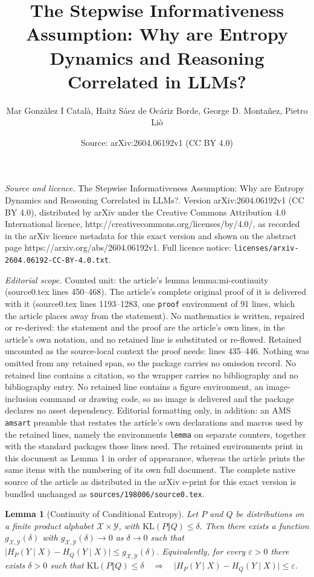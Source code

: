 \documentclass[10pt,a4paper]{amsart}
\title{The Stepwise Informativeness Assumption: Why are Entropy Dynamics and Reasoning Correlated in LLMs?}
\author{Mar Gonz\`alez I Catal\`a, Haitz S\'aez de Oc\'ariz Borde, George D. Monta\~nez, Pietro Li\`o}
\date{Source: arXiv:2604.06192v1 (CC BY 4.0)}
\newtheorem{lemma}{Lemma}
\begin{document}
\maketitle

\noindent\emph{Source and licence.} The Stepwise Informativeness Assumption: Why are Entropy Dynamics and Reasoning Correlated in LLMs?. Version arXiv:2604.06192v1 (CC BY 4.0), distributed by arXiv under the Creative Commons Attribution 4.0 International licence, http://creativecommons.org/licenses/by/4.0/, as recorded in the arXiv licence metadata for this exact version and shown on the abstract page https://arxiv.org/abs/2604.06192v1. Full licence notice: \texttt{licenses/arxiv-2604.06192-CC-BY-4.0.txt}.\par\smallskip

\noindent\textit{Editorial scope.} Counted unit: the article's lemma lemma:mi-continuity (source0.tex lines 450--468). The article's complete original proof of it is delivered with it (source0.tex lines 1193--1283, one \texttt{proof} environment of 91 lines, which the article places away from the statement). No mathematics is written, repaired or re-derived: the statement and the proof are the article's own lines, in the article's own notation, and no retained line is substituted or re-flowed.  Retained uncounted as the source-local context the proof needs: lines 435--446.  Nothing was omitted from any retained span, so the package carries no omission record.  No retained line contains a citation, so the wrapper carries no bibliography and no bibliography entry.  No retained line contains a figure environment, an image-inclusion command or drawing code, so no image is delivered and the package declares no asset dependency.  Editorial formatting only, in addition: an AMS \texttt{amsart} preamble that restates the article's own declarations and macros used by the retained lines, namely the environments \texttt{lemma} on separate counters, together with the standard packages those lines need.  The retained environments print in this document as Lemma 1 in order of appearance, whereas the article prints the same items with the numbering of its own full document.  The complete native source of the article as distributed in the arXiv e-print for this exact version is bundled unchanged as \texttt{sources/198006/source0.tex}.
\begin{lemma}[Continuity of Conditional Entropy]\label{lemma:cond-entropy-continuity}
Let $P$ and $Q$ be distributions on a finite product alphabet
$\mathcal{X} \times \mathcal{Y}$, with $\mathrm{KL}(P \Vert Q) \le \delta.$
Then there exists a function $g_{\mathcal{X},\mathcal{Y}}(\delta)$
with $g_{\mathcal{X},\mathcal{Y}}(\delta) \to 0$ as $\delta \to 0$
such that $\bigl| H_P(Y \mid X) - H_Q(Y \mid X) \bigr|
\le g_{\mathcal{X},\mathcal{Y}}(\delta).$
Equivalently, for every $\varepsilon > 0$ there exists $\delta > 0$
such that $\mathrm{KL}(P \Vert Q) \le \delta
\quad\Longrightarrow\quad
\bigl| H_P(Y \mid X) - H_Q(Y \mid X) \bigr| \le \varepsilon.$
\end{lemma}
\end{document}
